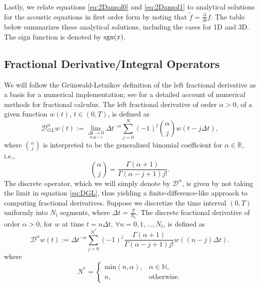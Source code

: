 Lastly, we relate equations \ref{eq:2Dansol0} and \ref{eq:2Dansol1} to analytical solutions for the acoustic equations in first order form by noting that $\tilde f = \tfrac{\partial}{\partial t}f$.
The table below summarizes these analytical solutions, including the cases for 1D and 3D. 
The sign function is denoted by ${\rm sgn}(x)$.



\subsection{Fractional Derivative/Integral Operators}

We will follow the Gr\"unwald-Letnikov definition of the left fractional derivative as a basis for a numerical implementation; see \cite{Li:15} for a detailed account of numerical methods for fractional calculus.
The left fractional derivative of order $\alpha>0$, of a given function $w(t)$, $t\in(0,T)$, is defined as
\begin{equation}\label{eq:DGL}
	\mathcal{D}^{\alpha}_{GL} w(t) := \lim_{\underset{N\Delta t=t}{\Delta t\to0}} \Delta t^{-\alpha} \sum_{j=0}^{N} (-1)^{j} {\alpha \choose j} w(t-j\Delta t),
\end{equation}
where ${\alpha \choose j}$ is interpreted to be the generalized binomial coefficient for $\alpha\in\mathbb R$, i.e.,
\[
	{\alpha \choose j} = \frac{\Gamma(\alpha+1)}{\Gamma(\alpha-j+1) j!}.
\]
The discrete operator, which we will simply denote by $\mathcal D^\alpha$, is given by not taking the limit in equation \ref{eq:DGL}, thus yielding a finite-difference-like approach to computing fractional derivatives. 
Suppose we discretize the time interval $(0,T)$ uniformly into $N_t$ segments, where $\Delta t = \tfrac{T}{N_t}$.
The discrete fractional derivative of order $\alpha>0$, for $w$ at time $t=n\Delta t$, $\forall n=0,1,...,N_t$, is defined as
\begin{equation}\label{eq:Derv}
	\mathcal D^{\alpha} w(t) :=  \Delta t^{-\alpha} \sum_{j=0}^{N^*} (-1)^{j}  \frac{\Gamma(\alpha+1)}{\Gamma(\alpha-j+1) j!} w((n-j)\Delta t).
\end{equation}
where
\[
	N^* = \left\{\begin{array}{cl}
		\text{min}(n,\alpha), &\alpha\in\mathbb N, \\
		n, & \text{otherwise}.
	\end{array}\right.
\]

